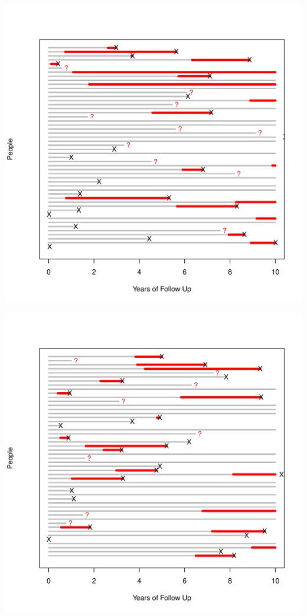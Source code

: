 \documentclass{article}\usepackage{graphicx, color}
\newenvironment{knitrout}{}{} %
\begin{document}
\begin{knitrout}
\color{fgcolor}\includegraphics[width=6in]{figure/two} 
\end{knitrout}


\begin{knitrout}
\color{fgcolor}\includegraphics[width=6in]{figure/three} 
\end{knitrout}
\end{document}

